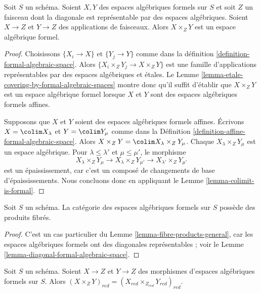 \begin{lemma}
\label{lemma-fibre-products-general}
Soit $S$ un schéma. Soient $X, Y$ des espaces algébriques formels sur $S$
et soit $Z$ un faisceau dont la diagonale est représentable par des
espaces algébriques. Soient $X \to Z$ et $Y \to Z$ des applications de faisceaux.
Alors $X \times_Z Y$ est un espace algébrique formel.
\end{lemma}

\begin{proof}
Choisissons $\{X_i \to X\}$ et $\{Y_j \to Y\}$ comme dans la
définition \ref{definition-formal-algebraic-space}.
Alors $\{X_i \times_Z Y_j \to X \times_Z Y\}$ est une famille
d'applications représentables par des espaces algébriques et étales.
Le Lemme \ref{lemma-etale-covering-by-formal-algebraic-spaces}
montre donc qu'il suffit d'établir que $X \times_Z Y$ est un espace algébrique
formel lorsque $X$ et $Y$ sont des espaces algébriques formels affines.

\medskip\noindent
Supposons que $X$ et $Y$ soient des espaces algébriques formels affines.
Écrivons $X = \colim X_\lambda$ et $Y = \colim Y_\mu$ comme
dans la Définition \ref{definition-affine-formal-algebraic-space}.
Alors $X \times_Z Y = \colim X_\lambda \times_Z Y_\mu$.
Chaque $X_\lambda \times_Z Y_\mu$ est un espace algébrique.
Pour $\lambda \leq \lambda'$ et $\mu \leq \mu'$, le morphisme
$$
X_\lambda \times_Z Y_\mu \to
X_\lambda \times_Z Y_{\mu'} \to
X_{\lambda'} \times_Z Y_{\mu'}
$$
est un épaississement, car c'est un composé de changements de base d'épaississements.
Nous concluons donc en appliquant le Lemme \ref{lemma-colimit-is-formal}.
\end{proof}

\begin{lemma}
\label{lemma-fibre-products}
Soit $S$ un schéma. La catégorie des espaces algébriques formels sur $S$
possède des produits fibrés.
\end{lemma}

\begin{proof}
C'est un cas particulier du Lemme \ref{lemma-fibre-products-general},
car les espaces algébriques formels ont des diagonales représentables ; voir le
Lemme \ref{lemma-diagonal-formal-algebraic-space}.
\end{proof}

\begin{lemma}
\label{lemma-reduction-fibre-products}
Soit $S$ un schéma. Soient $X \to Z$ et $Y \to Z$ des morphismes
d'espaces algébriques formels sur $S$. Alors
$(X \times_Z Y)_{red} = (X_{red} \times_{Z_{red}} Y_{red})_{red}$.
\end{lemma}

